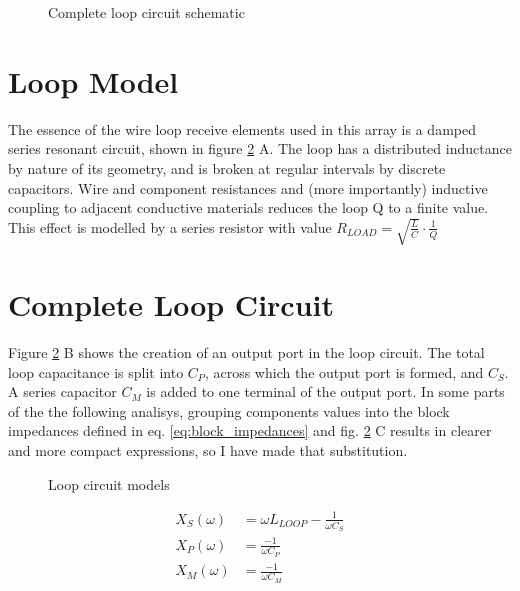 \begin{figure}
    \centering
    
    \caption{Complete loop circuit schematic}
    \label{fig:loop_schematic}
\end{figure}

\section{Loop Model}
The essence of the wire loop receive elements used in this array is a damped series resonant circuit, shown in figure
\ref{fig:loop_model} A. The loop has a distributed inductance by nature of its geometry, and is broken at regular
intervals by discrete capacitors.  Wire and component resistances and (more importantly) inductive coupling to adjacent
conductive materials reduces the loop Q to a finite value. This effect is modelled by a series resistor with value
$R_{LOAD}=\sqrt{\frac{L}{C}}\cdot\frac{1}{Q}$

\section{Complete Loop Circuit}
Figure \ref{fig:loop_model} B shows the creation of an output port in the loop circuit. The total loop capacitance is
split into $C_P$, across which the output port is formed, and $C_S$. A series capacitor $C_M$ is added to one terminal
of the output port. In some parts of the the following analisys, grouping components values into the block impedances
defined in eq. \ref{eq:block_impedances} and fig. \ref{fig:loop_model} C results in clearer and more compact
expressions, so I have made that substitution.

\begin{figure}
    \centering
    
    \caption{Loop circuit models}
    \label{fig:loop_model}
\end{figure}

\begin{equation}\label{eq:block_impedances}
    \begin{aligned}
        X_S(\omega) &= \omega L_{LOOP} - \frac{1}{\omega C_S}\\
        X_P(\omega) &= \frac{-1}{\omega C_P}\\
        X_M(\omega) &= \frac{-1}{\omega C_M}\\
    \end{aligned}
\end{equation}

